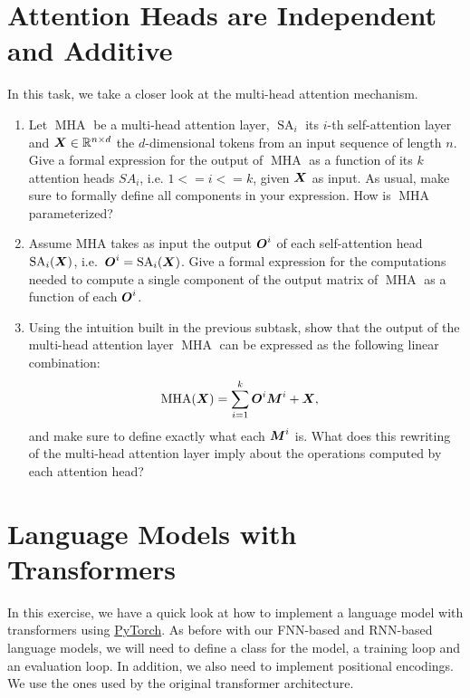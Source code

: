 \documentclass[11pt,a4paper]{article}
\newcommand\op[1]{\operatorname{#1}}
\begin{document}
\section{Attention Heads are Independent and Additive}

In this task, we take a closer look at the multi-head attention mechanism.

\begin{enumerate}[label=(\alph*)]
    \item Let $\op{MHA}$ be a multi-head attention layer, $\op{SA}_i$ its
          $i$-th self-attention layer and ${\boldsymbol{X}}\in \mathbb{R}^{n\times d}$ the
          $d$-dimensional tokens from an input sequence of length $n$.
          Give a formal expression for the output of $\op{MHA}$ as a function of
          its $k$ attention heads $SA_i$, i.e. $1 <= i <= k$, given ${\boldsymbol{X}}$ as
          input.
          As usual, make sure to formally define all components in your
          expression.
          How is $\op{MHA}$ parameterized?
    \item Assume MHA takes as input the output ${\boldsymbol{O}}^i$ of each self-attention
          head $\op{SA}_i(\mX)$, i.e.\ $\mO^i = \op{SA}_i(\mX)$.
          Give a formal expression for the computations needed to compute a 
          single component of the output matrix of $\op{MHA}$ as a function of
          each ${\boldsymbol{O}}^i$.
    \item Using the intuition built in the previous subtask, show that the
          output of the multi-head attention layer $\op{MHA}$ can be expressed 
          as the following linear combination:
          \begin{align}
              \op{MHA}(\mX) & = \sum_{i=1}^{k} \mO^i\mM^i + \mX,
          \end{align}
          and make sure to define exactly what each ${\boldsymbol{M}}^i$ is. 
          What does this rewriting of the multi-head attention layer imply about
          the operations computed by each attention head?
\end{enumerate}

\section{Language Models with Transformers}

In this exercise, we have a quick look at how to implement a language model with
transformers using \href{https://pytorch.org/}{PyTorch}.
As before with our FNN-based and RNN-based language models, we will need to
define a class for the model, a training loop and an evaluation loop.
In addition, we also need to implement positional encodings.
We use the ones used by the original transformer architecture.
\end{document}
